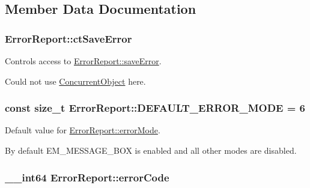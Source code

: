 \subsection{Member Data Documentation}
\hypertarget{class_error_report_a9a41fe576d2378b84b31d99cff4adf67}{
\subsubsection[{ctSaveError}]{ {\bf ErrorReport::ctSaveError}}}
\label{class_error_report_a9a41fe576d2378b84b31d99cff4adf67}


Controls access to \hyperlink{class_error_report_ac8c302c03f7ed5736f8856fdc6449f36}{ErrorReport::saveError}. 

Could not use \hyperlink{class_concurrent_object}{ConcurrentObject} here. \hypertarget{class_error_report_a5dccc8c1af25c623309118b349056ce3}{
\subsubsection[{DEFAULT\_\-ERROR\_\-MODE}]{\setlength{\rightskip}{0pt plus 5cm}const size\_\-t {\bf ErrorReport::DEFAULT\_\-ERROR\_\-MODE} = 6}}
\label{class_error_report_a5dccc8c1af25c623309118b349056ce3}


Default value for \hyperlink{class_error_report_ab43384b89b5e0b6addcde53268d3c578}{ErrorReport::errorMode}. 

By default EM\_\-MESSAGE\_\-BOX is enabled and all other modes are disabled. \hypertarget{class_error_report_a627028539c72742cec0c460eb1240fb5}{
\subsubsection[{errorCode}]{\setlength{\rightskip}{0pt plus 5cm}\_\-\_\-int64 {\bf ErrorReport::errorCode}}}
\label{class_error_report_a627028539c72742cec0c460eb1240fb5}


